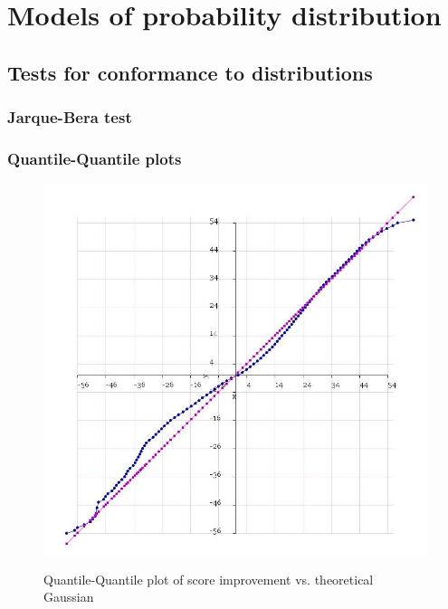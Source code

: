 \documentclass[10pt]{article}
\begin{document}
\section{Models of probability distribution}
\newpage
\subsection{Tests for conformance to distributions}
\newpage
\subsubsection{Jarque-Bera test}
\subsubsection{Quantile-Quantile plots}
\begin{figure}
\caption{Quantile-Quantile plot of score improvement vs. theoretical Gaussian}
\label{NormalProbabilityPlotImprovement}
\begin{center}
\includegraphics[width=120mm]{ReportMedia/NormalProbabilityPlotImprovement.jpg}\\
\end{center}
\end{figure}
\newpage
\end{document}
